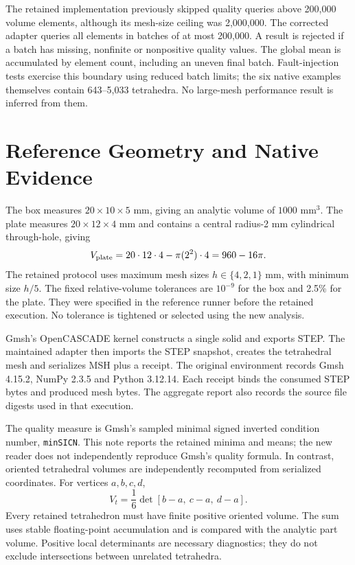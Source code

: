 \documentclass[twoside,leqno,twocolumn]{article}
\begin{document}
The retained implementation previously skipped quality queries above 200,000 volume elements, although its mesh-size ceiling was 2,000,000. The corrected adapter queries all elements in batches of at most 200,000. A result is rejected if a batch has missing, nonfinite or nonpositive quality values. The global mean is accumulated by element count, including an uneven final batch. Fault-injection tests exercise this boundary using reduced batch limits; the six native examples themselves contain 643--5,033 tetrahedra. No large-mesh performance result is inferred from them.

\section{Reference Geometry and Native Evidence}
The box measures $20\times10\times5$ mm, giving an analytic volume of $1000$ mm$^3$. The plate measures $20\times12\times4$ mm and contains a central radius-2 mm cylindrical through-hole, giving
\begin{equation}
 V_{\rm plate}=20\cdot12\cdot4-\pi(2^2)\cdot4=960-16\pi.
\end{equation}
The retained protocol uses maximum mesh sizes $h\in\{4,2,1\}$ mm, with minimum size $h/5$. The fixed relative-volume tolerances are $10^{-9}$ for the box and 2.5\% for the plate. They were specified in the reference runner before the retained execution. No tolerance is tightened or selected using the new analysis.

Gmsh's OpenCASCADE kernel constructs a single solid and exports STEP. The maintained adapter then imports the STEP snapshot, creates the tetrahedral mesh and serializes MSH plus a receipt. The original environment records Gmsh 4.15.2, NumPy 2.3.5 and Python 3.12.14. Each receipt binds the consumed STEP bytes and produced mesh bytes. The aggregate report also records the source file digests used in that execution.

The quality measure is Gmsh's sampled minimal signed inverted condition number, \texttt{minSICN}. This note reports the retained minima and means; the new reader does not independently reproduce Gmsh's quality formula. In contrast, oriented tetrahedral volumes are independently recomputed from serialized coordinates. For vertices $a,b,c,d$,
\begin{equation}
 V_t=\frac{1}{6}\det[b-a,\ c-a,\ d-a].
\end{equation}
Every retained tetrahedron must have finite positive oriented volume. The sum uses stable floating-point accumulation and is compared with the analytic part volume. Positive local determinants are necessary diagnostics; they do not exclude intersections between unrelated tetrahedra.
\end{document}
